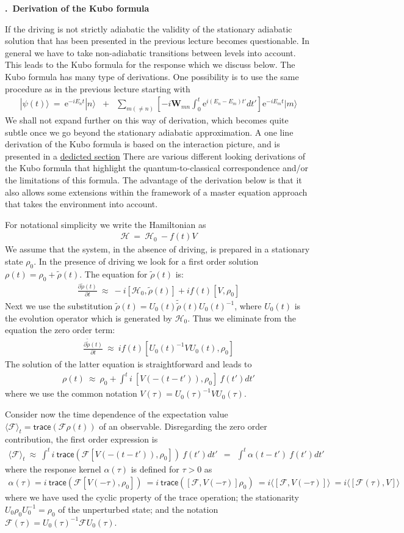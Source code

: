 \documentclass[onecolumn,fleqn, 11pt]{revtex4}
\newcommand{\trc}{\mathsf{trace}}
\newcommand{\eexp}{\mathrm{e}^}
\newcommand{\beq}{\begin{eqnarray}}
\newcommand{\eeq}{\end{eqnarray}}
\renewcommand{\thesubsection}{\arabic{subsection}}
\renewcommand{\thesubsubsection}{\arabic{subsubsection}}
\newcommand{\sheadC}[1]
{
\addtocounter{subsubsection}{1}
\vspace{5mm}
{\bf \thesubsection.\thesubsubsection \ #1}  
\nopagebreak
\phantomsection
}
\begin{document}
\sheadC{Derivation of the Kubo formula}

If the driving is not strictly adiabatic 
the validity of the stationary adiabatic solution
that has been presented in the previous lecture becomes questionable. 
In general we have to take non-adiabatic transitions between levels 
into account. This leads to the Kubo formula 
for the response which we discuss below.  
The Kubo formula has many type of derivations. 
One possibility is to use the same procedure 
as in the previous lecture starting with
\beq
| \psi(t) \rangle \ = \
\eexp{-iE_nt}|n\rangle 
&+& \sum_{m(\ne n)}
\left[-i\bm{W}_{mn}\int_0^t\eexp{i(E_n{-}E_m)t'}dt'\right]
\eexp{-iE_mt} |m\rangle
\eeq
We shall not expand further on this way of 
derivation, which becomes quite subtle once 
we go beyond the stationary adiabatic approximation. 
A one line derivation of the Kubo formula 
is based on the interaction picture, and is 
presented in a \hyperref[sKubo]{dedicted section} 
There are various different looking derivations 
of the Kubo formula that highlight 
the quantum-to-classical correspondence  
and/or the limitations of this formula.    
The advantage of the derivation below is that 
it also allows some extensions within the 
framework of a master equation approach 
that takes the environment into account.  


For notational simplicity we write the Hamiltonian as 
\beq
\mathcal{H} \ = \ \mathcal{H}_0 \ - f(t)V
\eeq
We assume that the system, in the absence
of driving, is prepared in a stationary state $\rho_0$.
In the presence of driving we look for a first order solution
$\rho(t) = \rho_0 +\tilde{\rho}(t)$.
The equation for $\tilde{\rho}(t)$ is:
\beq
\frac{\partial \tilde{\rho}(t)}{\partial t} \ \approx \
-i[\mathcal{H}_0, \tilde{\rho}(t)] + if(t)[V,\rho_0]
\eeq
Next we use the substitution 
$\tilde{\rho}(t) = U_0(t) \tilde{\tilde{\rho}}(t) U_0(t)^{-1}$, 
where $U_0(t)$ is the evolution operator
which is generated by $\mathcal{H}_0$.
Thus we eliminate from the equation the zero order term: 
\beq
\frac{\partial \tilde{\tilde{\rho}}(t) }{\partial t}
\ \approx \
if(t)[  U_0(t)^{-1}V U_0(t),\rho_0]
\eeq
The solution of the latter equation is straightforward and leads to
\beq
{\rho}(t)
\ \approx \ {\rho}_0 +
\int^{t}   i \ [V(-(t{-}t')), \rho_0]  \ f(t')dt'
\eeq
where we use the common notation 
$V(\tau)=U_0(\tau)^{-1}V U_0(\tau)$.


Consider now the time dependence of the expectation value
\mbox{$\langle \mathcal{F} \rangle_t = \trc(\mathcal{F}\rho(t))$}
of an observable. Disregarding the zero order contribution,
the first order expression is
\beq \nonumber
\langle \mathcal{F} \rangle_t
\ \approx \
\int^{t}  i \ \trc\left(\mathcal{F} [V(-(t{-}t')), \rho_0]\right)  \ f(t')dt'
\ \ = \ \ 
\int^{t}   \alpha(t-t')  \ f(t')dt'
\eeq
where the response kernel $\alpha(\tau)$ is
defined for $\tau>0$ as
\beq
\alpha(\tau) = i\ \trc\left(\mathcal{F} [V(-\tau), \rho_0]\right)
\ = i\ \trc\left([\mathcal{F}, V(-\tau)] \rho_0\right)
\ = i \langle [\mathcal{F}, V(-\tau)] \rangle
\ = i \langle [\mathcal{F}(\tau), V] \rangle
\eeq
where we have used the cyclic property of the trace operation;
the stationarity $U_0\rho_0 U_0^{-1}=\rho_0$ of
the unperturbed state; and the notation 
$\mathcal{F}(\tau)=U_0(\tau)^{-1}\mathcal{F}U_0(\tau)$.
\end{document}
